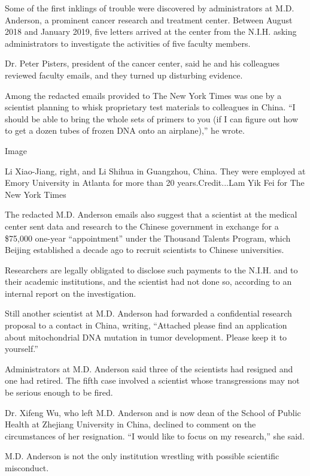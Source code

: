 Some of the first inklings of trouble were discovered by administrators
at M.D. Anderson, a prominent cancer research and treatment center.
Between August 2018 and January 2019, five letters arrived at the center
from the N.I.H. asking administrators to investigate the activities of
five faculty members.

Dr. Peter Pisters, president of the cancer center, said he and his
colleagues reviewed faculty emails, and they turned up disturbing
evidence.

Among the redacted emails provided to The New York Times was one by a
scientist planning to whisk proprietary test materials to colleagues in
China. ``I should be able to bring the whole sets of primers to you (if
I can figure out how to get a dozen tubes of frozen DNA onto an
airplane),'' he wrote.

Image

Li Xiao-Jiang, right, and Li Shihua in Guangzhou, China. They were
employed at Emory University in Atlanta for more than 20
years.Credit...Lam Yik Fei for The New York Times

The redacted M.D. Anderson emails also suggest that a scientist at the
medical center sent data and research to the Chinese government in
exchange for a \$75,000 one-year ``appointment'' under the Thousand
Talents Program, which Beijing established a decade ago to recruit
scientists to Chinese universities.

Researchers are legally obligated to disclose such payments to the
N.I.H. and to their academic institutions, and the scientist had not
done so, according to an internal report on the investigation.

Still another scientist at M.D. Anderson had forwarded a confidential
research proposal to a contact in China, writing, ``Attached please find
an application about mitochondrial DNA mutation in tumor development.
Please keep it to yourself.''

Administrators at M.D. Anderson said three of the scientists had
resigned and one had retired. The fifth case involved a scientist whose
transgressions may not be serious enough to be fired.

Dr. Xifeng Wu, who left M.D. Anderson and is now dean of the School of
Public Health at Zhejiang University in China, declined to comment on
the circumstances of her resignation. ``I would like to focus on my
research,'' she said.

M.D. Anderson is not the only institution wrestling with possible
scientific misconduct.

